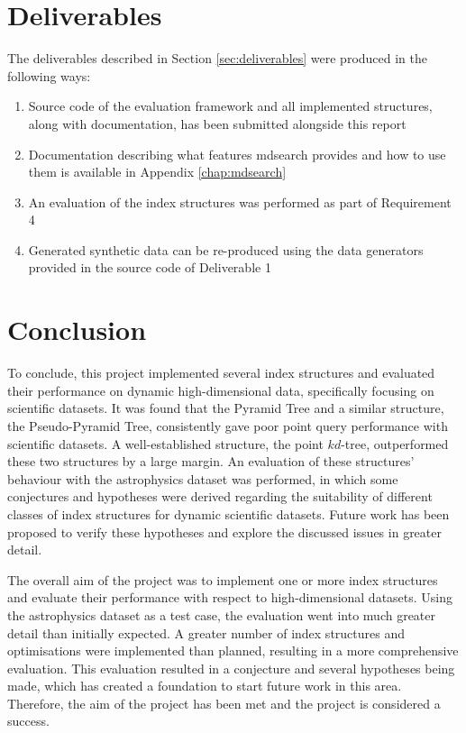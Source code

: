 \section{Deliverables}

The deliverables described in Section \ref{sec:deliverables} were produced in the following ways:
\begin{enumerate}
	\item Source code of the evaluation framework and all implemented structures, along with documentation, has been submitted alongside this report
	\item Documentation describing what features mdsearch provides and how to use them is available in Appendix \ref{chap:mdsearch}
	\item An evaluation of the index structures was performed as part of Requirement 4
	\item Generated synthetic data can be re-produced using the data generators provided in the source code of Deliverable 1
\end{enumerate}

\section{Conclusion}

To conclude, this project implemented several index structures and evaluated their performance on dynamic high-dimensional data, specifically focusing on scientific datasets. It was found that the Pyramid Tree and a similar structure, the Pseudo-Pyramid Tree, consistently gave poor point query performance with scientific datasets. A well-established structure, the point $kd$-tree, outperformed these two structures by a large margin. An evaluation of these structures' behaviour with the astrophysics dataset was performed, in which some conjectures and hypotheses were derived regarding the suitability of different classes of index structures for dynamic scientific datasets. Future work has been proposed to verify these hypotheses and explore the discussed issues in greater detail.

The overall aim of the project was to implement one or more index structures and evaluate their performance with respect to high-dimensional datasets. Using the astrophysics dataset as a test case, the evaluation went into much greater detail than initially expected. A greater number of index structures and optimisations were implemented than planned, resulting in a more comprehensive evaluation. This evaluation resulted in a conjecture and several hypotheses being made, which has created a foundation to start future work in this area. Therefore, the aim of the project has been met and the project is considered a success.